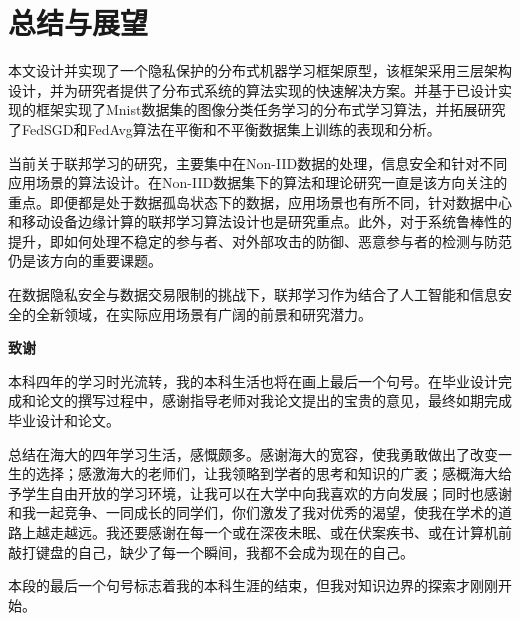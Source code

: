\documentclass[zihao = -4,cn]{oucart}
\begin{document}
\section{总结与展望}
本文设计并实现了一个隐私保护的分布式机器学习框架原型，该框架采用三层架构设计，并为研究者提供了分布式系统的算法实现的快速解决方案。并基于已设计实现的框架实现了Mnist数据集的图像分类任务学习的分布式学习算法，并拓展研究了FedSGD和FedAvg算法在平衡和不平衡数据集上训练的表现和分析。\par
当前关于联邦学习的研究，主要集中在Non-IID数据的处理，信息安全和针对不同应用场景的算法设计。在Non-IID数据集下的算法和理论研究一直是该方向关注的重点。即便都是处于数据孤岛状态下的数据，应用场景也有所不同，针对数据中心和移动设备边缘计算的联邦学习算法设计也是研究重点。此外，对于系统鲁棒性的提升，即如何处理不稳定的参与者、对外部攻击的防御、恶意参与者的检测与防范仍是该方向的重要课题。\par
在数据隐私安全与数据交易限制的挑战下，联邦学习作为结合了人工智能和信息安全的全新领域，在实际应用场景有广阔的前景和研究潜力。

\newpage
%


\newpage
\begin{center}
 \textbf{致谢} \\
\end{center}
\par
本科四年的学习时光流转，我的本科生活也将在画上最后一个句号。在毕业设计完成和论文的撰写过程中，感谢指导老师对我论文提出的宝贵的意见，最终如期完成毕业设计和论文。\par
总结在海大的四年学习生活，感慨颇多。感谢海大的宽容，使我勇敢做出了改变一生的选择；感激海大的老师们，让我领略到学者的思考和知识的广袤；感概海大给予学生自由开放的学习环境，让我可以在大学中向我喜欢的方向发展；同时也感谢和我一起竞争、一同成长的同学们，你们激发了我对优秀的渴望，使我在学术的道路上越走越远。我还要感谢在每一个或在深夜未眠、或在伏案疾书、或在计算机前敲打键盘的自己，缺少了每一个瞬间，我都不会成为现在的自己。\par
本段的最后一个句号标志着我的本科生涯的结束，但我对知识边界的探索才刚刚开始。

\end{document}
